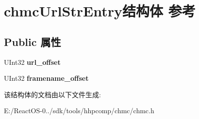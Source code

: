 \hypertarget{structchmc_url_str_entry}{}\section{chmc\+Url\+Str\+Entry结构体 参考}
\label{structchmc_url_str_entry}
\subsection*{Public 属性}
\begin{DoxyCompactItemize}
\item 
\mbox{\label{structchmc_url_str_entry_a61e6c31bc97c2507a63a11936f2ac379}} 
U\+Int32 {\bfseries url\+\_\+offset}
\item 
\mbox{\label{structchmc_url_str_entry_a4a2f54c9425b1d23dc15edaf569b05c1}} 
U\+Int32 {\bfseries framename\+\_\+offset}
\end{DoxyCompactItemize}


该结构体的文档由以下文件生成\+:\begin{DoxyCompactItemize}
\item 
E\+:/\+React\+O\+S-\/0../sdk/tools/hhpcomp/chmc/chmc.\+h\end{DoxyCompactItemize}
